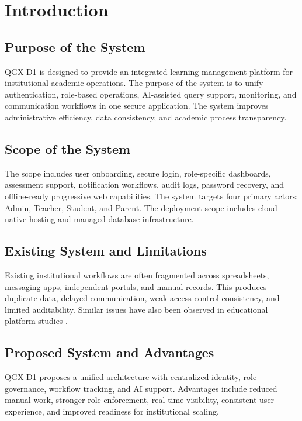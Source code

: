 \documentclass[12pt,a4paper]{article}
\renewcommand{\headrulewidth}{0.4pt}
\begin{document}
\newpage
\tableofcontents
\newpage
\listoffigures
\newpage
\listoftables
\newpage


\fancyhf{}
\fancyhead[L]{\nouppercase{\leftmark}}
\fancyfoot[R]{\thepage}
\renewcommand{\headrulewidth}{0.4pt}

\section{Introduction}

\subsection{Purpose of the System}
QGX-D1 is designed to provide an integrated learning management platform for institutional academic operations. The purpose of the system is to unify authentication, role-based operations, AI-assisted query support, monitoring, and communication workflows in one secure application. The system improves administrative efficiency, data consistency, and academic process transparency.

\subsection{Scope of the System}
The scope includes user onboarding, secure login, role-specific dashboards, assessment support, notification workflows, audit logs, password recovery, and offline-ready progressive web capabilities. The system targets four primary actors: Admin, Teacher, Student, and Parent. The deployment scope includes cloud-native hosting and managed database infrastructure.

\subsection{Existing System and Limitations}
Existing institutional workflows are often fragmented across spreadsheets, messaging apps, independent portals, and manual records. This produces duplicate data, delayed communication, weak access control consistency, and limited auditability. Similar issues have also been observed in educational platform studies \cite{anderson2022,lee2023}.

\subsection{Proposed System and Advantages}
QGX-D1 proposes a unified architecture with centralized identity, role governance, workflow tracking, and AI support. Advantages include reduced manual work, stronger role enforcement, real-time visibility, consistent user experience, and improved readiness for institutional scaling.
\end{document}
